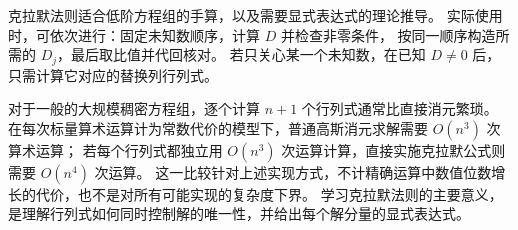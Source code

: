 \documentclass[UTF8,12pt,a4paper,fontset=fandol]{ctexart}
\begin{document}
克拉默法则适合低阶方程组的手算，以及需要显式表达式的理论推导。
实际使用时，可依次进行：固定未知数顺序，计算 $D$ 并检查非零条件，
按同一顺序构造所需的 $D_j$，最后取比值并代回核对。
若只关心某一个未知数，在已知 $D\ne0$ 后，只需计算它对应的替换列行列式。

对于一般的大规模稠密方程组，逐个计算 $n+1$ 个行列式通常比直接消元繁琐。
在每次标量算术运算计为常数代价的模型下，普通高斯消元求解需要 $O(n^3)$ 次算术运算；
若每个行列式都独立用 $O(n^3)$ 次运算计算，直接实施克拉默公式则需要 $O(n^4)$ 次运算。
这一比较针对上述实现方式，不计精确运算中数值位数增长的代价，也不是对所有可能实现的复杂度下界。
学习克拉默法则的主要意义，是理解行列式如何同时控制解的唯一性，并给出每个解分量的显式表达式。
\end{document}
